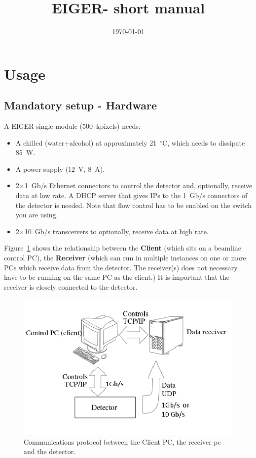 \documentclass{article}
\newcommand{\E}{EIGER\xspace}
\begin{document}
\title{\E - short manual}
\date{\today}
\maketitle
\tableofcontents

\section{Usage}

\subsection{Mandatory setup - Hardware}
A EIGER single module (500~kpixels) needs:
\begin{itemize}
\item A chilled (water+alcohol) at approximately 21~$^{\circ}$C, which needs to dissipate 85~W.
\item A power supply (12~V, 8~A).
\item 2$\times$1~Gb/s Ethernet connectors to control the detector and, optionally, receive data at low rate. A DHCP server that gives IPs to the 1~Gb/s connectors of the detector is needed. Note that flow control has to be enabled on the switch you are using.
\item 2$\times$10~Gb/s transceivers to optionally, receive data at high rate.
 \end{itemize}

Figure~\ref{fig:1} shows the relationship between the \textbf{Client} (which sits on a beamline control PC), the \textbf{Receiver} (which can run in multiple instances on one or more PCs which receive data from the detector. The receiver(s) does not necessary have to be running on the same PC as the client.) It is important that the receiver is closely connected to the detector.

\begin{figure}[t]
\begin{center}
\includegraphics[width=.8\textwidth]{Client2}
\end{center}
\caption{Communications protocol between the Client PC, the receiver pc and the detector.}
\label{fig:1}
\end{figure}
\end{document}
